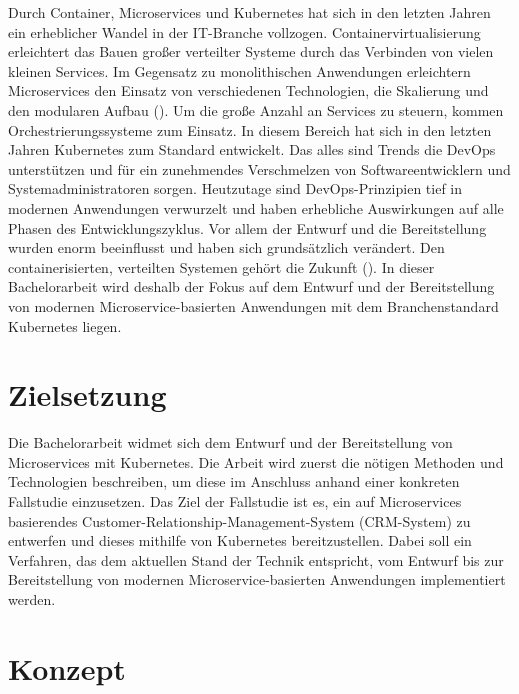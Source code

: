 \documentclass[
	a4paper,
	12pt,
	bibliography=numbered,
	listof=totoc,
	titlepage
]{scrartcl}
\begin{document}
Durch Container, Microservices und Kubernetes hat sich in den letzten Jahren ein erheblicher Wandel in der IT-Branche vollzogen.
Containervirtualisierung erleichtert das Bauen großer verteilter Systeme durch das Verbinden von vielen kleinen Services. Im Gegensatz zu monolithischen Anwendungen erleichtern Microservices den Einsatz von verschiedenen Technologien, die Skalierung und den modularen Aufbau (\cite[S. 24 ff.]{newmanMicroservicesKonzeption2015}). Um die große Anzahl an Services zu steuern, kommen Orchestrierungssysteme zum Einsatz. In diesem Bereich hat sich in den letzten Jahren Kubernetes zum Standard entwickelt. Das alles sind Trends die DevOps unterstützen und für ein zunehmendes Verschmelzen von Softwareentwicklern und Systemadministratoren sorgen. Heutzutage sind DevOps-Prinzipien tief in modernen Anwendungen verwurzelt und haben erhebliche Auswirkungen auf alle Phasen des Entwicklungszyklus. Vor allem der Entwurf und die Bereitstellung wurden enorm beeinflusst und haben sich grundsätzlich verändert. Den containerisierten, verteilten Systemen gehört die Zukunft (\cite[S. 1]{arundelCloudNative2019a}). In dieser Bachelorarbeit wird deshalb der Fokus auf dem Entwurf und der Bereitstellung von modernen Microservice-basierten Anwendungen mit dem Branchenstandard Kubernetes liegen.

\clearpage
\section{Zielsetzung}

Die Bachelorarbeit widmet sich dem Entwurf und der Bereitstellung von Microservices mit Kubernetes. Die Arbeit wird zuerst die nötigen Methoden und Technologien beschreiben, um diese im Anschluss anhand einer konkreten Fallstudie einzusetzen. Das Ziel der Fallstudie ist es, ein auf Microservices basierendes Customer-Relationship-Management-System (CRM-System) zu entwerfen und dieses mithilfe von Kubernetes bereitzustellen. Dabei soll ein Verfahren, das dem aktuellen Stand der Technik entspricht, vom Entwurf bis zur Bereitstellung von modernen Microservice-basierten Anwendungen implementiert werden.

\clearpage
\section{Konzept}
\end{document}
